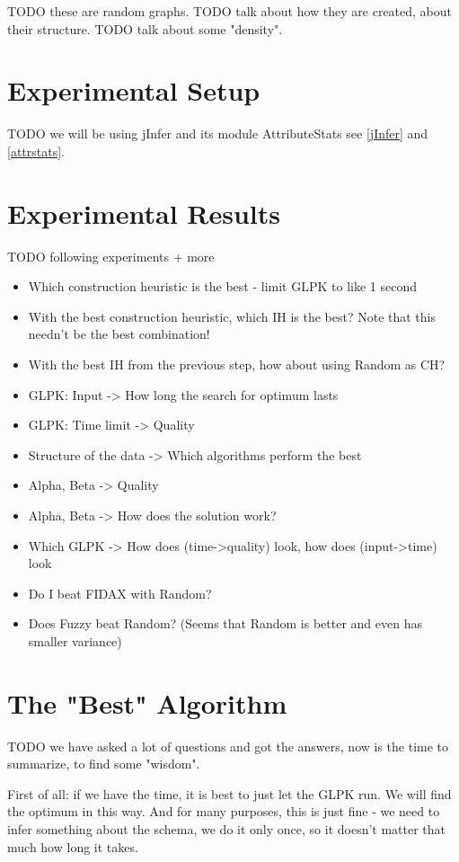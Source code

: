 \documentclass[a4paper,12pt,oneside]{report}
\begin{document}
TODO these are random graphs.
TODO talk about how they are created, about their structure.
TODO talk about some "density".

\section{Experimental Setup}

TODO we will be using jInfer and its module AttributeStats see \ref{jInfer} and \ref{attrstats}.

\section{Experimental Results}

TODO following experiments + more

\begin{itemize}
  \item Which construction heuristic is the best - limit GLPK to like 1 second
  \item With the best construction heuristic, which IH is the best? Note that this needn't be the best combination!
  \item With the best IH from the previous step, how about using Random as CH?
	\item GLPK: Input -> How long the search for optimum lasts
	\item GLPK: Time limit -> Quality
	\item Structure of the data -> Which algorithms perform the best
	\item Alpha, Beta -> Quality
  \item Alpha, Beta -> How does the solution work?
	\item Which GLPK -> How does (time->quality) look, how does (input->time) look
	\item Do I beat FIDAX with Random?
	\item Does Fuzzy beat Random? (Seems that Random is better and even has smaller variance)
\end{itemize}

\section{The "Best" Algorithm}

TODO we have asked a lot of questions and got the answers, now is the time to summarize, to find some "wisdom".

First of all: if we have the time, it is best to just let the GLPK run. 
We will find the optimum in this way. 
And for many purposes, this is just fine - we need to infer something about the schema, we do it only once, so it doesn't matter that much how long it takes.
\end{document}
